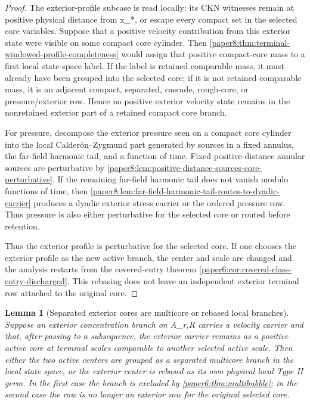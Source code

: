 \documentclass[11pt]{amsart}
\def\({}%
\def\){}%
\theoremstyle{plain}
\newtheorem{lemma}[lemma]{Lemma}
\theoremstyle{definition}
\theoremstyle{remark}
\begin{document}
\begin{proof}
The exterior-profile subcase is read locally: its CKN witnesses remain at
positive physical distance from \(x_*\), or escape every compact set in the
selected core variables.  Suppose that a positive velocity contribution from
this exterior state were visible on some compact core cylinder.  Then
\cref{paper8:thm:terminal-windowed-profile-completeness} would assign that
positive compact-core mass to a first local state-space label.  If the label is
retained comparable mass, it must already have been grouped into the selected
core; if it is not retained comparable mass, it is an adjacent compact,
separated, cascade, rough-core, or pressure/exterior row.  Hence no positive
exterior velocity state remains in the nonretained exterior part of a retained
compact core branch.
\par
For pressure, decompose the exterior pressure seen on a compact core cylinder
into the local Calder\'on--Zygmund part generated by sources in a fixed annulus,
the far-field harmonic tail, and a function of time.  Fixed positive-distance
annular sources are perturbative by
\cref{paper8:lem:positive-distance-sources-core-perturbative}.  If the
remaining far-field harmonic tail does not vanish modulo functions of time,
then
\cref{paper8:lem:far-field-harmonic-tail-routes-to-dyadic-carrier} produces a
dyadic exterior stress carrier or the ordered pressure row.  Thus pressure is
also either perturbative for the selected core or routed before retention.
\par
Thus the exterior profile is perturbative for the selected core.  If one
chooses the exterior profile as the new active branch, the center and scale are
changed and the analysis restarts from the covered-entry theorem
\cref{paper6:cor:covered-class-entry-discharged}.  This rebasing does not
leave an independent exterior terminal row attached to the original core.
\end{proof}

\begin{lemma}[Separated exterior cores are multicore or rebased local branches]
\label{paper8:lem:separated-exterior-core-is-multicore}
Suppose an exterior concentration branch on \(A_{r,R}\) carries a velocity
carrier and that, after passing to a subsequence, the exterior carrier remains
as a positive active core at terminal scales comparable to another selected
active scale.  Then either the two active centers are grouped as a separated
multicore branch in the local state space, or the exterior center is rebased as
its own physical local Type II germ.  In the first case the branch is excluded
by \cref{paper6:thm:multibubble}; in the second case the row is no longer an
exterior row for the original selected core.
\end{lemma}
\end{document}
